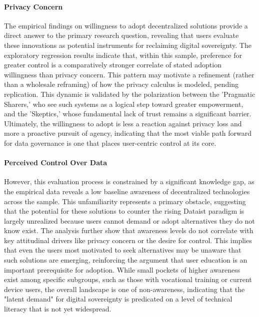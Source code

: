 	\paragraph{Privacy Concern}
	The empirical findings on willingness to adopt decentralized solutions provide a direct answer to the primary research question, revealing that users evaluate these innovations as potential instruments for reclaiming digital sovereignty. The exploratory regression results indicate that, within this sample, preference for greater control is a comparatively stronger correlate of stated adoption willingness than privacy concern. This pattern may motivate a refinement (rather than a wholesale reframing) of how the privacy calculus is modeled, pending replication. This dynamic is validated by the polarization between the 'Pragmatic Sharers,' who see such systems as a logical step toward greater empowerment, and the 'Skeptics,' whose fundamental lack of trust remains a significant barrier. Ultimately, the willingness to adopt is less a reaction against privacy loss and more a proactive pursuit of agency, indicating that the most viable path forward for data governance is one that places user-centric control at its core.

	\paragraph{Perceived Control Over Data}
	However, this evaluation process is constrained by a significant knowledge gap, as the empirical data reveals a low baseline awareness of decentralized technologies across the sample. This unfamiliarity represents a primary obstacle, suggesting that the potential for these solutions to counter the rising Dataist paradigm is largely unrealized because users cannot demand or adopt alternatives they do not know exist. The analysis further show that awareness levels do not correlate with key attitudinal drivers like privacy concern or the desire for control. This implies that even the users most motivated to seek alternatives may be unaware that such solutions are emerging, reinforcing the argument that user education is an important prerequisite for adoption. While small pockets of higher awareness exist among specific subgroups, such as those with vocational training or current device users, the overall landscape is one of non-awareness, indicating that the "latent demand" for digital sovereignty is predicated on a level of technical literacy that is not yet widespread.

